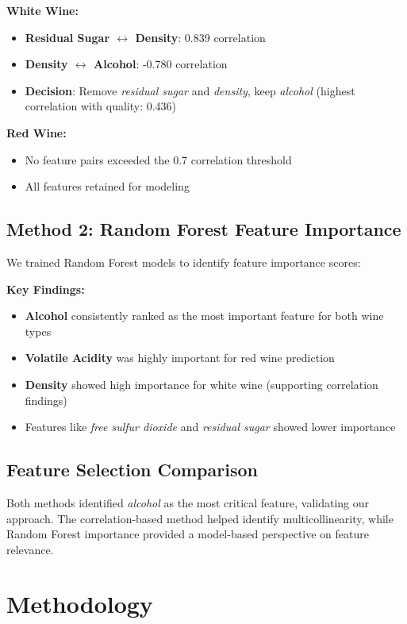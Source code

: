 \documentclass[12pt]{article}
\begin{document}
\textbf{White Wine:}
\begin{itemize}
    \item \textbf{Residual Sugar $\leftrightarrow$ Density}: 0.839 correlation
    \item \textbf{Density $\leftrightarrow$ Alcohol}: -0.780 correlation
    \item \textbf{Decision}: Remove \textit{residual sugar} and \textit{density}, keep \textit{alcohol} (highest correlation with quality: 0.436)
\end{itemize}

\textbf{Red Wine:}
\begin{itemize}
    \item No feature pairs exceeded the 0.7 correlation threshold
    \item All features retained for modeling
\end{itemize}

\subsection{Method 2: Random Forest Feature Importance}
We trained Random Forest models to identify feature importance scores:

\textbf{Key Findings:}
\begin{itemize}
    \item \textbf{Alcohol} consistently ranked as the most important feature for both wine types
    \item \textbf{Volatile Acidity} was highly important for red wine prediction
    \item \textbf{Density} showed high importance for white wine (supporting correlation findings)
    \item Features like \textit{free sulfur dioxide} and \textit{residual sugar} showed lower importance
\end{itemize}

\subsection{Feature Selection Comparison}
Both methods identified \textit{alcohol} as the most critical feature, validating our approach. The correlation-based method helped identify multicollinearity, while Random Forest importance provided a model-based perspective on feature relevance.

\section{Methodology}
\end{document}
